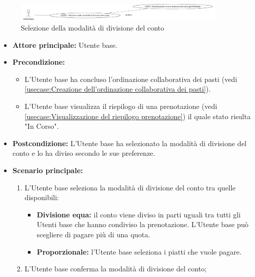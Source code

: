 \label{usecase:Selezione della modalità di divisione del conto}

\begin{figure}[h]
	\centering
	\includegraphics[width=0.9\textwidth]{./uml/UCB15.png} 
	\caption{Selezione della modalità di divisione del conto}
	\label{fig:UCB14}
  \end{figure}

\begin{itemize}
	\item \textbf{Attore principale:} Utente base.
	
	\item \textbf{Precondizione:}
	\begin{itemize}
		\item L'Utente base ha concluso l'ordinazione collaborativa dei pasti (vedi \autoref{usecase:Creazione dell'ordinazione collaborativa dei pasti}).
		\item L'Utente base visualizza il riepilogo di una prenotazione (vedi \autoref{usecase:Visualizzazione del riepilogo prenotazione}) il quale stato risulta "In Corso". 
	\end{itemize}

	\item \textbf{Postcondizione:}
	      L'Utente base ha selezionato la modalità di divisione del conto e lo ha diviso secondo le sue preferenze.
	\item \textbf{Scenario principale:}
	      \begin{enumerate}
		      \item L'Utente base seleziona la modalità di divisione del conto
		            tra quelle disponibili:
					\begin{itemize}
						\item \textbf{Divisione equa:} il conto viene diviso in parti
							  uguali tra tutti gli Utenti base che hanno condiviso la
							  prenotazione. L'Utente base può scegliere di pagare più di
							  una quota.
		  
						\item \textbf{Proporzionale:} l'Utente base seleziona i piatti che vuole
							  pagare.
					\end{itemize}

		      \item L'Utente base conferma la modalità di divisione del conto;


\end{enumerate}
\end{itemize}
